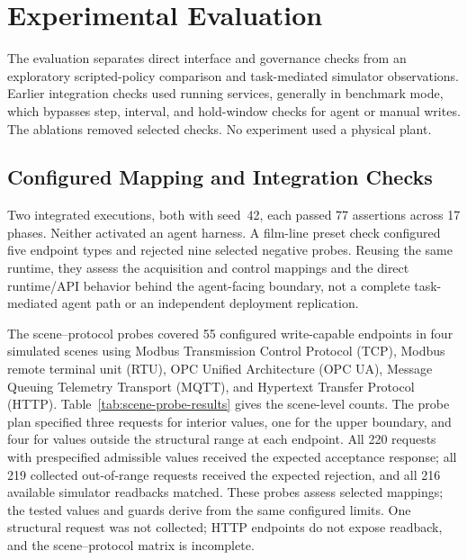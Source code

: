 \section{Experimental Evaluation}
\label{sec:eval}
The evaluation separates direct interface and governance checks from an exploratory scripted-policy comparison and task-mediated simulator observations. Earlier integration checks used running services, generally in benchmark mode, which bypasses step, interval, and hold-window checks for agent or manual writes. The ablations removed selected checks. No experiment used a physical plant.

\subsection{Configured Mapping and Integration Checks}
\label{sec:eval-mapping}
Two integrated executions, both with seed~42, each passed 77 assertions across 17 phases. Neither activated an agent harness. A film-line preset check configured five endpoint types and rejected nine selected negative probes. Reusing the same runtime, they assess the acquisition and control mappings and the direct runtime/API behavior behind the agent-facing boundary, not a complete task-mediated agent path or an independent deployment replication.

The scene--protocol probes covered 55 configured write-capable endpoints in four simulated scenes using Modbus Transmission Control Protocol (TCP), Modbus remote terminal unit (RTU), OPC Unified Architecture (OPC UA), Message Queuing Telemetry Transport (MQTT), and Hypertext Transfer Protocol (HTTP). Table~\ref{tab:scene-probe-results} gives the scene-level counts. The probe plan specified three requests for interior values, one for the upper boundary, and four for values outside the structural range at each endpoint. All 220 requests with prespecified admissible values received the expected acceptance response; all 219 collected out-of-range requests received the expected rejection, and all 216 available simulator readbacks matched. These probes assess selected mappings; the tested values and guards derive from the same configured limits. One structural request was not collected; HTTP endpoints do not expose readback, and the scene--protocol matrix is incomplete.

